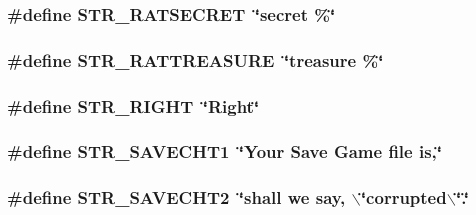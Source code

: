 \label{FOREIGN_8H_aa8b68eb407b2fd48b234f989d8e435ee}
\hypertarget{FOREIGN_8H_a0ba1c4378f7364c95f40100bd3c0934e}{
\subsubsection[{STR\_\-RATSECRET}]{\setlength{\rightskip}{0pt plus 5cm}\#define STR\_\-RATSECRET~\char`\"{}secret    \%\char`\"{}}}
\label{FOREIGN_8H_a0ba1c4378f7364c95f40100bd3c0934e}
\hypertarget{FOREIGN_8H_ad4aa07d4583f6a7ccf1871095e7b5cd4}{
\subsubsection[{STR\_\-RATTREASURE}]{\setlength{\rightskip}{0pt plus 5cm}\#define STR\_\-RATTREASURE~\char`\"{}treasure    \%\char`\"{}}}
\label{FOREIGN_8H_ad4aa07d4583f6a7ccf1871095e7b5cd4}
\hypertarget{FOREIGN_8H_a3826c62e951a2cffc5bc9f724554c1d0}{
\subsubsection[{STR\_\-RIGHT}]{\setlength{\rightskip}{0pt plus 5cm}\#define STR\_\-RIGHT~\char`\"{}Right\char`\"{}}}
\label{FOREIGN_8H_a3826c62e951a2cffc5bc9f724554c1d0}
\hypertarget{FOREIGN_8H_a1561c5dd5358156375de580d9c83affc}{
\subsubsection[{STR\_\-SAVECHT1}]{\setlength{\rightskip}{0pt plus 5cm}\#define STR\_\-SAVECHT1~\char`\"{}Your Save Game file is,\char`\"{}}}
\label{FOREIGN_8H_a1561c5dd5358156375de580d9c83affc}
\hypertarget{FOREIGN_8H_a726598228f06d149b6e91feeb0939e5e}{
\subsubsection[{STR\_\-SAVECHT2}]{\setlength{\rightskip}{0pt plus 5cm}\#define STR\_\-SAVECHT2~\char`\"{}shall we say, $\backslash$\char`\"{}corrupted$\backslash$\char`\"{}.\char`\"{}}}

